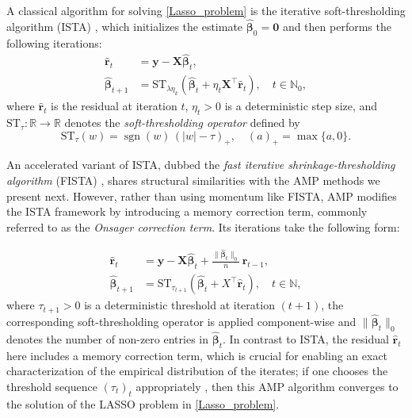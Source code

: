 A classical algorithm for solving \eqref{Lasso_problem} is the iterative soft-thresholding algorithm (ISTA) \cite{ISTA}, which initializes the estimate $\hat{\bm{\beta}}_0 = \mathbf{0}$ and then performs the following iterations:
\begin{equation}
\begin{split}
    \hat{\bm{r}}_t &= \bm{y} - \bm{X} \hat{\bm{\beta}}_t, \\
    \hat{\bm{\beta}}_{t+1} &= \text{ST}_{\lambda \eta_k} \!\left( \hat{\bm{\beta}}_t + \eta_t \bm{X}^\top \hat{\bm{r}}_t \right), 
    \quad t \in \mathbb{N}_0,
\end{split}
\end{equation}
where $\hat{\bm{r}}_t$ is the residual at iteration $t$, $\eta_t > 0$ is a deterministic step size, and $\text{ST}_\tau : \mathbb{R} \to \mathbb{R}$ denotes the \emph{soft-thresholding operator} defined by  
\begin{equation}
\text{ST}_\tau(w) = \operatorname{sgn}(w) \, (|w| - \tau)_+, 
\quad (a)_+ = \max\{a, 0\}.
\end{equation}

An accelerated variant of ISTA, dubbed the \emph{fast iterative shrinkage-thresholding algorithm} (FISTA) \cite{FISTA}, shares structural similarities with the AMP methods we present next. However, rather than using momentum like FISTA, AMP modifies the ISTA framework by introducing a memory correction term, commonly referred to as the \emph{Onsager correction term}. Its iterations take the following form:

\begin{equation}
\label{FISTA}
\begin{aligned}
    \hat{\bm{r}}_t &= \bm{y} - \bm{X} \hat{\bm{\beta}}_t + \frac{\lVert \hat{\bm{\beta}}_t \rVert_0}{n} \, \hat{\bm{r}}_{t-1}, \\
    \hat{\bm{\beta}}_{t+1} &= \text{ST}_{\tau_{t+1}} \!\left( \hat{\bm{\beta}}_t + X^\top \hat{\bm{r}}_t \right), 
    \quad t \in \mathbb{N},
\end{aligned}
\end{equation}
where $\tau_{t+1} > 0$ is a deterministic threshold at iteration $(t+1)$, the corresponding soft-thresholding operator is applied component-wise and $\lVert \hat{\bm{\beta}}_t \rVert_0$ denotes the number of non-zero entries in $\hat{\bm{\beta}}_t$.  
In contrast to ISTA, the residual $\hat{\bm{r}}_t$ here includes a memory correction term, which is crucial for enabling an exact characterization of the empirical distribution of the iterates; if one chooses the threshold sequence $(\tau_t)_t$ appropriately \cite{feng2022unifying}, then this AMP algorithm converges to the solution of the LASSO problem in \eqref{Lasso_problem}.  

